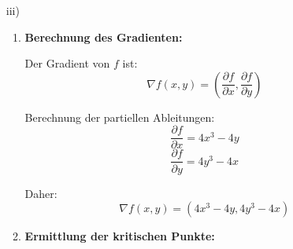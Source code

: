 {\begin{itemize}
\begin{enumerate}
Daher:
\[
\nabla f(x, y) = (3x^2 - 3y, -3x + 3y^2)
\]

\item \textbf{Ermittlung der kritischen Punkte:}

Kritische Punkte treten dort auf, wo der Gradient Null ist:
\[
3x^2 - 3y = 0
\]
\[
-3x + 3y^2 = 0
\]

Vereinfachung dieser Gleichungen:
\[
x^2 = y \quad \text{(1)}
\]
\[
x = y^2 \quad \text{(2)}
\]

Einsetzen von Gleichung (2) in Gleichung (1):
\[
(y^2)^2 = y \implies y^4 = y \implies y(y^3 - 1) = 0
\]

Auflösen nach $ y $:
\[
y = 0 \quad \text{oder} \quad y^3 = 1 \implies y = 1
\]

Für $ y = 0 $:
\[
x = 0
\]

Für $ y = 1 $:
\[
x = (1)^2 = 1
\]

Daher sind die kritischen Punkte $ (0, 0) $ und $ (1, 1) $.

%
%
%
%
%
\end{enumerate}
\item[iii)]
\begin{enumerate}
\item \textbf{Berechnung des Gradienten:}

Der Gradient von $ f $ ist:
\[
\nabla f(x, y) = \left( \frac{\partial f}{\partial x}, \frac{\partial f}{\partial y} \right)
\]

Berechnung der partiellen Ableitungen:
\[
\frac{\partial f}{\partial x} = 4x^3 - 4y
\]
\[
\frac{\partial f}{\partial y} = 4y^3 - 4x
\]

Daher:
\[
\nabla f(x, y) = (4x^3 - 4y, 4y^3 - 4x)
\]

\item \textbf{Ermittlung der kritischen Punkte:}


\end{enumerate}
\end{itemize}}
